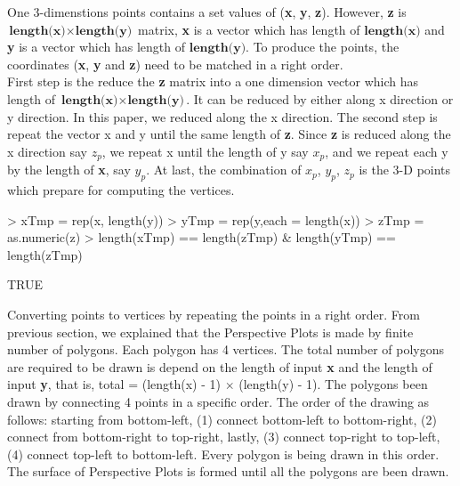 \documentclass{report}
\begin{document}
One 3-dimenstions points contains a set values of (\textbf{x}, \textbf{y}, \textbf{z}). However, \textbf{z} is $\textbf{length(x)} \times \textbf{length(y)}$ matrix, \textbf{x} is a vector which has length of $\textbf{length(x)}$ and \textbf{y} is a vector which has length of $\textbf{length(y)}$. To produce the points, the coordinates (\textbf{x}, \textbf{y} and \textbf{z}) need to be matched in a right order.\\

First step is the reduce the \textbf{z} matrix into a one dimension vector which has length of $\textbf{length(x)} \times \textbf{length(y)}$. It can be reduced by either along x direction or y direction. In this paper, we reduced along the x direction. The second step is repeat the vector x and y until the same length of \textbf{z}. Since \textbf{z} is reduced along the x direction say $z_p$, we repeat x until the length of y say $x_p$, and we repeat each y by the length of \textbf{x}, say $y_p$. At last, the combination of $x_p$, $y_p$, $z_p$ is the 3-D points which prepare for computing the vertices. \\
\begin{Schunk}
\begin{Sinput}
> xTmp = rep(x, length(y))
> yTmp = rep(y,each = length(x))
> zTmp = as.numeric(z)
> length(xTmp) == length(zTmp) & length(yTmp) == length(zTmp)
\end{Sinput}
\begin{Soutput}
[1] TRUE
\end{Soutput}
\end{Schunk}

Converting points to vertices by repeating the points in a right order. From previous section, we explained that the Perspective Plots is made by finite number of polygons. Each polygon has 4 vertices. The total number of polygons are required to be drawn is depend on the length of input \textbf{x} and the length of input \textbf{y}, that is, total = (length(x) - 1) $\times$ (length(y) - 1). The polygons been drawn by connecting 4 points in a specific order. The order of the drawing as follows: starting from bottom-left, (1) connect bottom-left to bottom-right, (2) connect from bottom-right to top-right, lastly, (3) connect top-right to top-left, (4) connect top-left to bottom-left. Every polygon is being drawn in this order. The surface of Perspective Plots is formed until all the polygons are been drawn. \\
\end{document}
